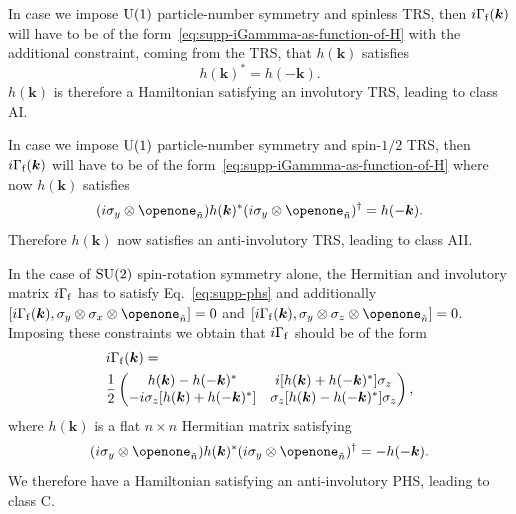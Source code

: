 \documentclass[prl,twocolumn,preprintnumbers,superscriptaddress,amsmath,amssymb]{revtex4-1}
\begin{document}
In case we impose ${\rm U}(1)$ particle-number symmetry and spinless TRS, then $i\Gamma_{\rm f}(\boldsymbol{k})$ will have to be of the form~\eqref{eq:supp-iGammma-as-function-of-H} with the additional constraint, coming from the TRS, that $h(\boldsymbol{k})$ satisfies
\begin{equation}
    h(\boldsymbol{k})^*=h(-\boldsymbol{k}).
    \label{eq:supp-trs}
\end{equation}
$h(\boldsymbol{k})$ is therefore a Hamiltonian satisfying an involutory TRS, leading to class AI.

In case we impose ${\rm U}(1)$ particle-number symmetry and spin-$1/2$ TRS, then $i\Gamma_{\rm f}(\boldsymbol{k})$ will have to be of the form~\eqref{eq:supp-iGammma-as-function-of-H} where now $h(\boldsymbol{k})$ satisfies
\begin{equation}
    (i\sigma_y\otimes\openone_{\tilde n})h(\boldsymbol{k})^*(i\sigma_y\otimes\openone_{\tilde n})^\dag=h(-\boldsymbol{k}).
    \label{AIIH}
\end{equation}
Therefore $h(\boldsymbol{k})$ now satisfies an anti-involutory TRS, leading to class AII.

In the case of ${\rm SU}(2)$ spin-rotation symmetry alone, the Hermitian and involutory matrix $i\Gamma_{\rm f}$ has to satisfy Eq.~\eqref{eq:supp-phs} and additionally $[i\Gamma_{\rm f}(\boldsymbol{k}),\sigma_y\otimes\sigma_x\otimes\openone_{\tilde n}]=0$ and $[i\Gamma_{\rm f}(\boldsymbol{k}),\sigma_y\otimes\sigma_z\otimes\openone_{\tilde n}]=0$. Imposing these constraints we obtain that $i\Gamma_{\rm f}$ should be of the form 
\begin{align}
&i\Gamma_{\rm f}(\boldsymbol{k})=\nonumber\\
&\frac{1}{2}\begin{pmatrix} h(\boldsymbol{k}) - h(-\boldsymbol{k})^* & i[h(\boldsymbol{k}) + h(-\boldsymbol{k})^*]\sigma_z \\ - i\sigma_z [h(\boldsymbol{k}) + h(-\boldsymbol{k})^*] & \sigma_z [h(\boldsymbol{k}) - h(-\boldsymbol{k})^*]\sigma_z \end{pmatrix},
\label{eq:supp-iGammma-as-function-of-Q}
\end{align}
where $h(\boldsymbol{k})$ is a flat $n\times n$ Hermitian matrix satisfying
\begin{equation}
    (i\sigma_y\otimes\openone_{\tilde n})h(\boldsymbol{k})^*(i\sigma_y\otimes\openone_{\tilde n})^\dag=-h(-\boldsymbol{k}).
    \label{eq:supp-anti-inv-phs}
\end{equation}
We therefore have a Hamiltonian satisfying an anti-involutory PHS, leading to class C.
\end{document}
